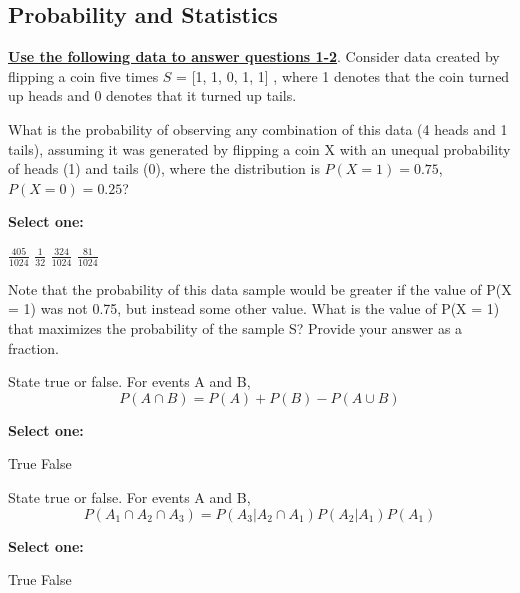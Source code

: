 \documentclass[11pt,addpoints,answers]{exam}
\numberwithin{equation}{section} %
\numberwithin{figure}{section} %
\numberwithin{table}{section} %
\begin{document}
\subsection{Probability and Statistics}

\textbf{\underline{Use the following data to answer questions 1-2}}. Consider data created by flipping a coin five times $S $ = [1, 1, 0, 1, 1] , where 1 denotes that the coin turned up heads and 0 denotes that it turned up tails. \bigskip

\begin{questions}
    \question[1] What is the probability of observing any combination of this data (4 heads and 1 tails), assuming it was generated by flipping a coin X with an unequal probability of heads (1) and tails (0), where the distribution is $P(X = 1) = 0.75$, $P(X = 0) = 0.25$?

    \textbf{Select one:}
    \begin{checkboxes}
        \choice $\frac{405}{1024}$
        \choice $\frac{1}{32}$
        \choice $\frac{324}{1024}$
        \choice $\frac{81}{1024}$
    \end{checkboxes}


    \question[1] Note that the probability of this data sample would be greater if the value of P(X = 1) was not 0.75, but instead some other value. What is the value of P(X = 1) that maximizes the probability of the sample S? Provide your answer as a fraction.
    
    \begin{tcolorbox}[fit,height=1cm, width=2cm, blank, borderline={1pt}{-2pt},nobeforeafter]
    \end{tcolorbox}


    \question[1] State true or false. For events A and B, $$ P(A \cap B) = P(A) + P(B) - P(A \cup B)$$

    \textbf{Select one:}
    \begin{checkboxes}
        \choice True
        \choice False
    \end{checkboxes}


    \question[1] State true or false. For events A and B, $$P(A_1\cap A_2 \cap A_3) = P(A_3|A_2\cap A_1)P(A_2|A_1)P(A_1)$$

    \textbf{Select one:}
    \begin{checkboxes}
        \choice True
        \choice False
    \end{checkboxes}

    
    

\end{questions}
\end{document}
